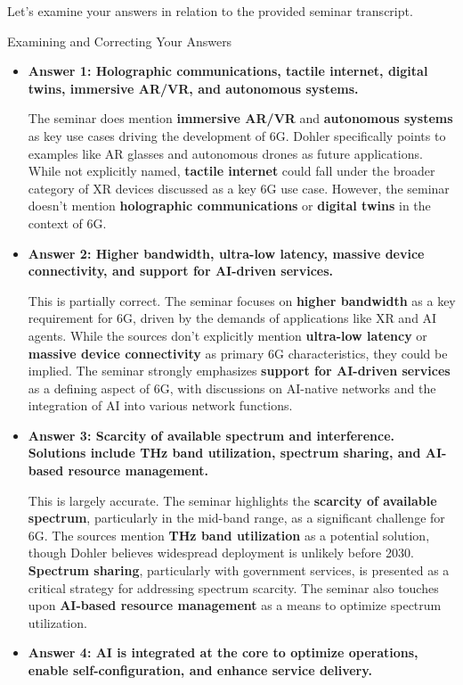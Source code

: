 \documentclass[
]{article}
\author{}
\date{}
\begin{document}
Let's examine your answers in relation to the provided seminar
transcript.

{Examining and Correcting Your
Answers}\label{examining-and-correcting-your-answers}

\begin{itemize}
\item
  \textbf{Answer 1: Holographic communications, tactile internet,
  digital twins, immersive AR/VR, and autonomous systems.}

  The seminar does mention \textbf{immersive AR/VR} and
  \textbf{autonomous systems} as key use cases driving the development
  of 6G. Dohler specifically points to examples like AR glasses and
  autonomous drones as future applications. While not explicitly named,
  \textbf{tactile internet} could fall under the broader category of XR
  devices discussed as a key 6G use case. However, the seminar doesn't
  mention \textbf{holographic communications} or \textbf{digital twins}
  in the context of 6G.
\item
  \textbf{Answer 2: Higher bandwidth, ultra-low latency, massive device
  connectivity, and support for AI-driven services.}

  This is partially correct. The seminar focuses on \textbf{higher
  bandwidth} as a key requirement for 6G, driven by the demands of
  applications like XR and AI agents. While the sources don't explicitly
  mention \textbf{ultra-low latency} or \textbf{massive device
  connectivity} as primary 6G characteristics, they could be implied.
  The seminar strongly emphasizes \textbf{support for AI-driven
  services} as a defining aspect of 6G, with discussions on AI-native
  networks and the integration of AI into various network functions.
\item
  \textbf{Answer 3: Scarcity of available spectrum and interference.
  Solutions include THz band utilization, spectrum sharing, and AI-based
  resource management.}

  This is largely accurate. The seminar highlights the \textbf{scarcity
  of available spectrum}, particularly in the mid-band range, as a
  significant challenge for 6G. The sources mention \textbf{THz band
  utilization} as a potential solution, though Dohler believes
  widespread deployment is unlikely before 2030. \textbf{Spectrum
  sharing}, particularly with government services, is presented as a
  critical strategy for addressing spectrum scarcity. The seminar also
  touches upon \textbf{AI-based resource management} as a means to
  optimize spectrum utilization.
\item
  \textbf{Answer 4: AI is integrated at the core to optimize operations,
  enable self-configuration, and enhance service delivery.}


\end{itemize}
\end{document}
